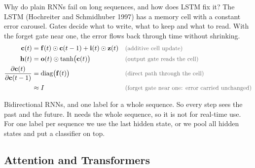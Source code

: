 \begin{qabox}{Why do plain RNNs fail on long sequences, and how does LSTM fix it?}
\explain The LSTM (Hochreiter and Schmidhuber 1997) has a memory cell with a constant error
carousel. Gates decide what to write, what to keep and what to read. With the forget gate near one,
the error flows back through time without shrinking.
\derive
\begin{align*}
\mathbf{c}(t) &= \mathbf{f}(t)\odot\mathbf{c}(t-1) + \mathbf{i}(t)\odot\mathbf{z}(t) \why{additive cell update} \\
\mathbf{h}(t) &= \mathbf{o}(t)\odot\tanh\bigl(\mathbf{c}(t)\bigr) \why{output gate reads the cell} \\
\frac{\partial\mathbf{c}(t)}{\partial\mathbf{c}(t-1)} &= \mathrm{diag}\bigl(\mathbf{f}(t)\bigr) \why{direct path through the cell} \\
&\approx I \why{forget gate near one: error carried unchanged}
\end{align*}
\end{qabox}

\begin{qabox}{Bidirectional RNNs, and one label for a whole sequence.}
\explain So every step sees the past and the future. It needs the whole sequence, so it is not for
real-time use. For one label per sequence we use the last hidden state, or we pool all hidden
states and put a classifier on top.
\end{qabox}

\subsection{Attention and Transformers}

